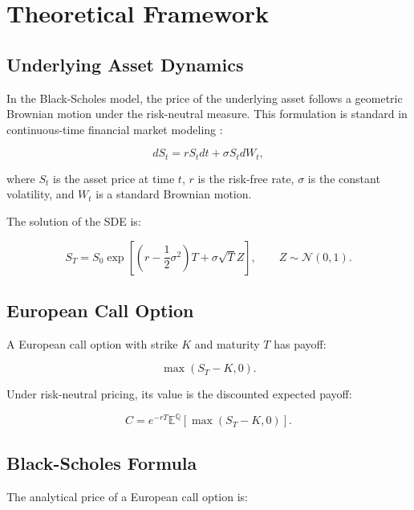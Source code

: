 \chapter{Theoretical Framework}

\section{Underlying Asset Dynamics}

In the Black-Scholes model, the price of the underlying asset follows a geometric Brownian motion under the risk-neutral measure.
This formulation is standard in continuous-time financial market modeling \cite{shreve2004stochastic}:

\begin{equation}
    dS_t = r S_t dt + \sigma S_t dW_t,
\end{equation}

where $S_t$ is the asset price at time $t$, $r$ is the risk-free rate, $\sigma$ is the constant volatility, and $W_t$ is a standard Brownian motion.

The solution of the SDE is:

\begin{equation}
    S_T = S_0 \exp\left[\left(r - \frac{1}{2}\sigma^2\right)T + \sigma \sqrt{T} Z\right],
    \qquad Z \sim \mathcal{N}(0,1).
\end{equation}

\section{European Call Option}

A European call option with strike $K$ and maturity $T$ has payoff:

\begin{equation}
    \max(S_T - K, 0).
\end{equation}

Under risk-neutral pricing, its value is the discounted expected payoff:

\begin{equation}
    C = e^{-rT}\mathbb{E}^{\mathbb{Q}}\left[\max(S_T - K, 0)\right].
\end{equation}

\section{Black-Scholes Formula}

The analytical price of a European call option is:

